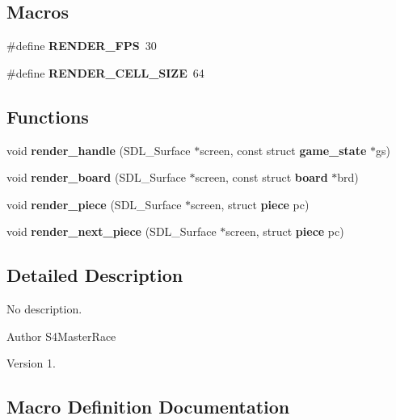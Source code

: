 \subsection*{Macros}
\begin{DoxyCompactItemize}
\item 
\#define \textbf{ R\+E\+N\+D\+E\+R\+\_\+\+F\+PS}~30
\item 
\#define \textbf{ R\+E\+N\+D\+E\+R\+\_\+\+C\+E\+L\+L\+\_\+\+S\+I\+ZE}~64
\end{DoxyCompactItemize}
\subsection*{Functions}
\begin{DoxyCompactItemize}
\item 
void \textbf{ render\+\_\+handle} (S\+D\+L\+\_\+\+Surface $\ast$screen, const struct \textbf{ game\+\_\+state} $\ast$gs)
\item 
void \textbf{ render\+\_\+board} (S\+D\+L\+\_\+\+Surface $\ast$screen, const struct \textbf{ board} $\ast$brd)
\item 
void \textbf{ render\+\_\+piece} (S\+D\+L\+\_\+\+Surface $\ast$screen, struct \textbf{ piece} pc)
\item 
void \textbf{ render\+\_\+next\+\_\+piece} (S\+D\+L\+\_\+\+Surface $\ast$screen, struct \textbf{ piece} pc)
\end{DoxyCompactItemize}


\subsection{Detailed Description}
No description. 

\begin{DoxyAuthor}{Author}
S4\+Master\+Race 
\end{DoxyAuthor}
\begin{DoxyVersion}{Version}
1. 
\end{DoxyVersion}


\subsection{Macro Definition Documentation}
\mbox{\label{render_8h_a5330c5ad1244a89bc3670addda01eeef}} 
